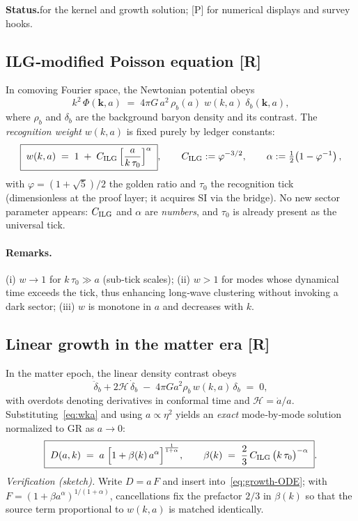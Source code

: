 \documentclass[11pt]{article}
\begin{document}
\noindent\textbf{Status.}\;[R] for the kernel and growth solution; [P] for numerical displays and survey hooks.

\subsection{ILG‑modified Poisson equation [R]}
In comoving Fourier space, the Newtonian potential obeys
\begin{equation}
\label{eq:ILG-Poisson}
k^{2}\,\Phi(\mathbf k,a)\;=\;4\pi G\,a^{2}\,\rho_{b}(a)\;w(k,a)\;\delta_{b}(\mathbf k,a),
\end{equation}
where $\rho_{b}$ and $\delta_{b}$ are the background baryon density and its contrast. The \emph{recognition weight} $w(k,a)$ is fixed purely by ledger constants:
\begin{equation}
\label{eq:wka}
\boxed{\;
w(k,a)\;=\;1\;+\;C_{\rm ILG}\,\Bigl[\frac{a}{k\,\tau_{0}}\Bigr]^{\alpha}\;},\qquad
C_{\rm ILG}:=\varphi^{-3/2},\qquad
\alpha:=\tfrac12\!\left(1-\varphi^{-1}\right),
\end{equation}
with $\varphi=(1+\sqrt5)/2$ the golden ratio and $\tau_{0}$ the recognition tick (dimensionless at the proof layer; it acquires SI via the bridge). No new sector parameter appears: $C_{\rm ILG}$ and $\alpha$ are \emph{numbers}, and $\tau_{0}$ is already present as the universal tick.

\paragraph{Remarks.}
(i) $w\!\to\!1$ for $k\,\tau_{0}\!\gg\! a$ (sub‑tick scales); (ii) $w\!>\!1$ for modes whose dynamical time exceeds the tick, thus enhancing long‑wave clustering without invoking a dark sector; (iii) $w$ is monotone in $a$ and decreases with $k$.

\subsection{Linear growth in the matter era [R]}
In the matter epoch, the linear density contrast obeys
\begin{equation}
\label{eq:growth-ODE}
\ddot\delta_{b} + 2\mathcal H\,\dot\delta_{b}
\;-\;4\pi G a^{2}\rho_{b}\,w(k,a)\,\delta_{b}\;=\;0,
\end{equation}
with overdots denoting derivatives in conformal time and $\mathcal H=\dot a/a$. Substituting~\eqref{eq:wka} and using $a\propto\eta^{2}$ yields an \emph{exact} mode‑by‑mode solution normalized to GR as $a\!\to\!0$:
\begin{equation}
\label{eq:D-solution}
\boxed{\;
D(a,k)\;=\;a\;\Bigl[1+\beta(k)\,a^{\alpha}\Bigr]^{\frac{1}{1+\alpha}},
\qquad
\beta(k)\;=\;\frac{2}{3}\,C_{\rm ILG}\,\bigl(k\,\tau_{0}\bigr)^{-\alpha}\;}.
\end{equation}
\emph{Verification (sketch).} Write $D=a\,F$ and insert into~\eqref{eq:growth-ODE}; with $F=(1+\beta a^{\alpha})^{1/(1+\alpha)}$, cancellations fix the prefactor $2/3$ in $\beta(k)$ so that the source term proportional to $w(k,a)$ is matched identically.
\end{document}

